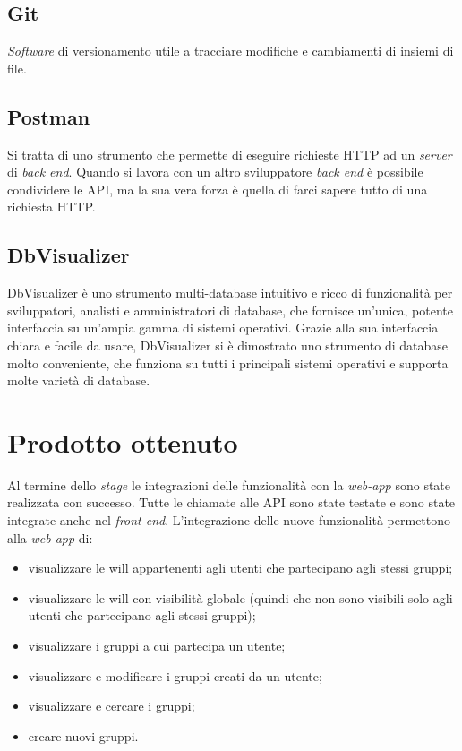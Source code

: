 \subsection{Git}
\textit{Software} di versionamento utile a tracciare modifiche e cambiamenti di insiemi di file.
\subsection{Postman}
Si tratta di uno strumento che permette di eseguire richieste HTTP ad un \textit{server} di \textit{back end}. Quando si lavora con un altro sviluppatore 
\textit{back end} è possibile condividere le \gls{API}, ma la sua vera forza è quella di farci sapere tutto di una richiesta HTTP.
\subsection{DbVisualizer}
DbVisualizer è uno strumento multi-database intuitivo e ricco di funzionalità per sviluppatori, analisti e amministratori di database, che fornisce 
un'unica, potente interfaccia su un'ampia gamma di sistemi operativi. Grazie alla sua interfaccia chiara e facile da usare, DbVisualizer si è dimostrato 
uno strumento di database molto conveniente, che funziona su tutti i principali sistemi operativi e supporta molte varietà di database. 


\section{Prodotto ottenuto}
Al termine dello \textit{stage} le integrazioni delle funzionalità con la \textit{web-app} sono state realizzata con successo. Tutte le chiamate alle \gls{API} 
sono state testate e sono state integrate anche nel \textit{front end}. 
L'integrazione delle nuove funzionalità permettono alla \textit{web-app} di: 
\begin{itemize}
    \item  visualizzare le \gls{will} appartenenti agli utenti che partecipano agli stessi 
    gruppi;
    \item visualizzare le \gls{will} con visibilità globale (quindi che non sono visibili solo agli utenti che partecipano agli stessi gruppi);
    \item visualizzare i gruppi a cui partecipa un utente;
    \item visualizzare e modificare i gruppi creati da un utente;
    \item visualizzare e cercare i gruppi;
    \item creare nuovi gruppi.
\end{itemize}
\pagebreak
